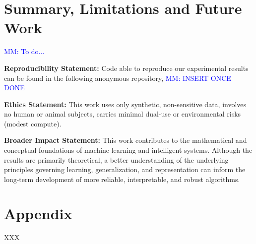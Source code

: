 \documentclass[10pt]{article} %
\newcommand{\mm}[1]{\textcolor{blue}{MM: #1}}
\begin{document}
\section{Summary, Limitations and Future Work}

\mm{To do...}


\textbf{Reproducibility Statement:} Code able to reproduce our experimental results can be found in the following anonymous repository, \mm{INSERT ONCE DONE}

\textbf{Ethics Statement:} This work uses only synthetic, non-sensitive data, involves no human or animal subjects, carries minimal dual-use or environmental risks (modest compute).

\textbf{Broader Impact Statement:} This work contributes to the mathematical and conceptual foundations of machine learning and intelligent systems. Although the results are primarily theoretical, a better understanding of the underlying principles governing learning, generalization, and representation can inform the long-term development of more reliable, interpretable, and robust algorithms.





\appendix
\section{Appendix}
XXX
\end{document}
